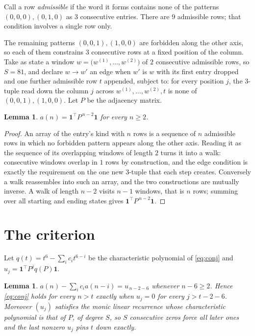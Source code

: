 \documentclass[11pt,a4paper]{article}
\theoremstyle{plain}
\newtheorem{lemma}[theorem]{Lemma}
\theoremstyle{definition}
\begin{document}
Call a row \emph{admissible} if the word it forms contains none of the patterns
$(0,0,0), (0,1,0)$ as $3$ consecutive entries. There are $9$ admissible rows; that condition
involves a single row only.

The remaining patterns $(0,0,1), (1,0,0)$ are forbidden along the other axis, so each of them
constrains $3$ consecutive rows at a fixed position of the column. Take as state a
window $w=\bigl(w^{(1)},\dots,w^{(2)}\bigr)$ of $2$ consecutive admissible
rows, so $S=81$, and declare $w\to w'$ an edge when $w'$ is $w$ with its first entry
dropped and one further admissible row $t$ appended, subject to: for every position
$j$, the $3$-tuple read down the column $j$ across $w^{(1)},\dots,w^{(2)},t$
is none of $(0,0,1), (1,0,0)$. Let $P$ be the adjacency matrix.

\begin{lemma}\label{lem:walk}
$a(n)=\mathbf{1}^{\!\top}P^{\,n-2}\mathbf{1}$ for every $n\ge2$.
\end{lemma}

\begin{proof}
An array of the entry's kind with $n$ rows is a sequence of $n$ admissible rows in
which no forbidden pattern appears along the other axis. Reading it as the sequence of its
overlapping windows of length $2$ turns it into a walk: consecutive windows overlap in
$1$ rows by construction, and the edge condition is exactly the requirement on the one
new $3$-tuple that each step creates. Conversely a walk reassembles into such an array,
and the two constructions are mutually inverse. A walk of length $n-2$ visits $n-1$
windows, that is $n$ rows; summing over all starting and ending states gives
$\mathbf{1}^{\!\top}P^{\,n-2}\mathbf{1}$.
\end{proof}

\section{The criterion}

Let $q(t)=t^{6}-\sum_i c_i t^{6-i}$ be the characteristic polynomial of
\eqref{eq:conj} and $u_j=\mathbf{1}^{\!\top}P^{j}q(P)\mathbf{1}$.

\begin{lemma}\label{lem:crit}
$a(n)-\sum_i c_i a(n-i)=u_{\,n-2-6}$ whenever $n-6\ge2$. Hence
\eqref{eq:conj} holds for every $n>t$ exactly when $u_j=0$ for every
$j>t-2-6$. Moreover $(u_j)$ satisfies the monic linear recurrence whose
characteristic polynomial is that of $P$, of degree $S$, so $S$ consecutive zeros force all
later ones and the last nonzero $u_j$ pins $t$ down exactly.
\end{lemma}
\end{document}

